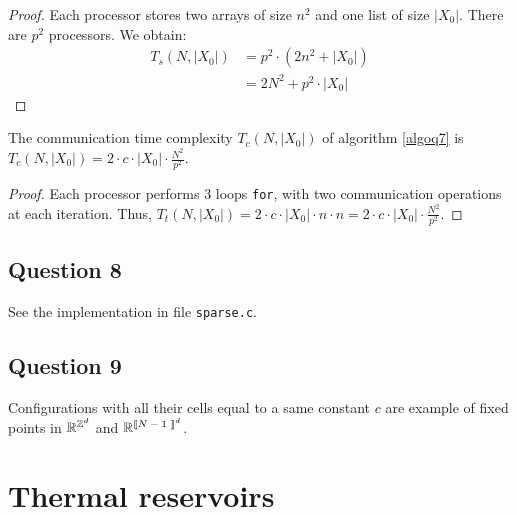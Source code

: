 \begin{proof}
 Each processor stores two arrays of size $n^2$ and one list of size $|X_0|$. There are $p^2$ processors. We obtain:
 \[
    \begin{split}
        T_s(N,|X_0|) & = p^2 \cdot (2 n^2 + |X_0|) \\
                     & = 2 N^2 + p^2 \cdot |X_0|
    \end{split}
 \] 
\end{proof}

\begin{prop}
 The communication time complexity $T_c(N,|X_0|)$ of algorithm \ref{algoq7} is $T_c(N,|X_0|) = 2 \cdot c \cdot |X_0| \cdot \frac{N^2}{p^2}$.
\end{prop}

\begin{proof}
 Each processor performs 3 loops \texttt{for}, with two communication operations at each iteration. Thus, $T_t(N,|X_0|) = 2 \cdot c \cdot |X_0| \cdot n \cdot n = 2 \cdot c \cdot |X_0| \cdot \frac{N^2}{p^2}$. 
\end{proof}


\subsection*{Question 8}

See the implementation in file \texttt{sparse.c}.


\subsection*{Question 9}

Configurations with all their cells equal to a same constant $c$ are example of fixed points in $\mathbb{R}^{\mathbb{Z}^d}$ and $\RR^{\text{\textlbrackdbl $N-1$ \textrbrackdbl}^d}$.



\section{Thermal reservoirs}

